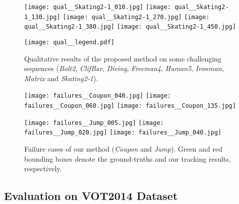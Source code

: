\documentclass[10pt,twocolumn,letterpaper]{article}
\begin{document}
\begin{figure*}
\begin{center}
\texttt{[image: qual\_\_Skating2-1\_010.jpg]}
\texttt{[image: qual\_\_Skating2-1\_130.jpg]}
\texttt{[image: qual\_\_Skating2-1\_270.jpg]}
\texttt{[image: qual\_\_Skating2-1\_380.jpg]}
\texttt{[image: qual\_\_Skating2-1\_450.jpg]}

\texttt{[image: qual\_\_legend.pdf]}

\end{center}
\vspace{-5mm}
\caption{Qualitative results of the proposed method on some challenging sequences (\emph{Bolt2}, \emph{ClifBar}, \emph{Diving}, \emph{Freeman4}, \emph{Human5}, \emph{Ironman}, \emph{Matrix} and \emph{Skating2-1}).}
\label{fig:qual}
\end{figure*}

\begin{figure}[t]
\begin{center}
\texttt{[image: failures\_\_Coupon\_040.jpg]}
\texttt{[image: failures\_\_Coupon\_060.jpg]}
\texttt{[image: failures\_\_Coupon\_135.jpg]}

\texttt{[image: failures\_\_Jump\_005.jpg]}
\texttt{[image: failures\_\_Jump\_020.jpg]}
\texttt{[image: failures\_\_Jump\_040.jpg]}

\end{center}
\vspace{-5mm}
\caption{Failure cases of our method (\emph{Coupon} and \emph{Jump}). Green and red bounding boxes denote the ground-truths and our tracking results, respectively.}
\label{fig:failure}
\end{figure}


\subsection{Evaluation on VOT2014 Dataset}
\end{document}
